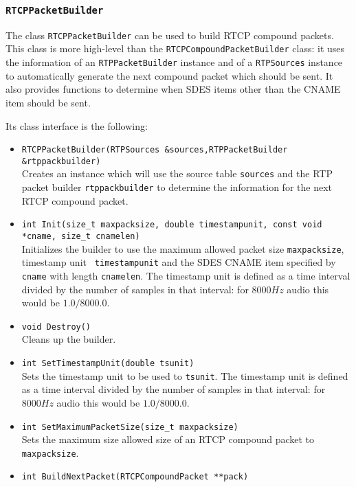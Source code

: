 \documentclass[12pt,a4paper]{article}
\newcommand{\headerfile}[1]{\marginpar{\scriptsize Header:\\{\tt #1}}}
\begin{document}
			\subsubsection{\tt RTCPPacketBuilder}\headerfile{rtcppacketbuilder.h}

				The class {\tt RTCPPacketBuilder} can be used to build RTCP
				compound packets. This class is more high-level than the
				{\tt RTCPCompoundPacketBuilder} class: it uses the information
				of an {\tt RTPPacketBuilder} instance and of a {\tt RTPSources}
				instance to automatically generate the next compound packet which should
				be sent. It also provides functions to determine when SDES items
				other than the CNAME item should be sent.

				Its class interface is the following:
				\begin{itemize}
					\item {\tt RTCPPacketBuilder(RTPSources \&sources,RTPPacketBuilder \&rtppackbuilder)}\\
						Creates an instance which will use the source table
						{\tt sources} and the RTP packet builder {\tt rtppackbuilder}
						to determine the information for the next RTCP compound packet.
					\item {\tt int Init(size\_t maxpacksize, double timestampunit, const void *cname, size\_t cnamelen)}\\
						Initializes the builder to use the maximum allowed
						packet size {\tt maxpacksize}, timestamp unit {\tt
						timestampunit} and the SDES CNAME item specified by {\tt
						cname} with length {\tt cnamelen}. The timestamp unit
						is defined as a time interval divided by the number of
						samples in that interval: for $8000 Hz$ audio this would
						be $1.0/8000.0$.
					\item {\tt void Destroy()}\\
						Cleans up the builder.
					\item {\tt int SetTimestampUnit(double tsunit)}\\
						Sets the timestamp unit to be used to {\tt tsunit}. The
						timestamp unit is defined as a time interval divided
						by the number of samples in that interval: for $8000 Hz$
						audio this would be $1.0/8000.0$.
					\item {\tt int SetMaximumPacketSize(size\_t maxpacksize)}\\
						Sets the maximum size allowed size of an RTCP compound
						packet to {\tt maxpacksize}.
					\item {\tt int BuildNextPacket(RTCPCompoundPacket **pack)}\\

\end{itemize}
\end{document}
